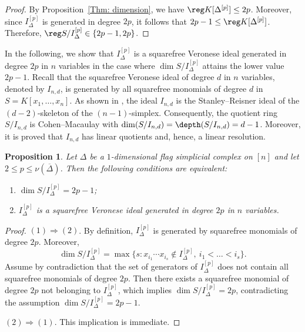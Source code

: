 \documentclass[12pt]{amsart}
\newtheorem{Proposition}[Theorem]{Proposition}
\begin{document}
\begin{proof}
By Proposition~\ref{Thm: dimension}, we have $\reg K[\Delta^{[p]}] \le 2p$. Moreover, since
$I_{\Delta}^{[p]}$ is generated in degree $2p$, it follows that
$2p-1 \le \reg K[\Delta^{[p]}]$. Therefore,
$\reg S/I_{\Delta}^{[p]} \in \{2p-1,2p\}$.
\end{proof}
In the following, we show that $I_{\Delta}^{[p]}$ is a squarefree Veronese ideal generated
in degree $2p$ in $n$ variables in the case where
$\dim S/I_{\Delta}^{[p]}$ attains the lower value $2p-1$. Recall that the squarefree
Veronese ideal of degree $d$ in $n$ variables, denoted by $I_{n,d}$, is generated by all squarefree monomials of degree $d$ in $S=K[x_1,\dots,x_n]$. As shown in
\cite{HHmonomialideals}, the ideal $I_{n,d}$ is the Stanley--Reisner ideal of the
$(d-2)$-skeleton of the $(n-1)$-simplex. Consequently, the quotient ring $S/I_{n,d}$ is Cohen--Macaulay with $\dim(S/I_{n,d})=\depth(S/I_{n,d})=d-1$. Moreover, it is proved that $I_{n,d}$ has linear quotients and, hence, a linear resolution.



\begin{Proposition}\label{prop: veronese}
Let $\Delta$ be a $1$-dimensional flag simplicial complex on $[n]$ and let
$2\leq p \leq \nu(\overline{\Delta})$. Then the following conditions are equivalent:
\begin{enumerate}
    \item $\dim S/I_{\Delta}^{[p]}=2p-1$;
    \item $I_{\Delta}^{[p]}$ is a squarefree Veronese ideal generated in degree $2p$
    in $n$ variables.
\end{enumerate}
\end{Proposition}

\begin{proof}
$(1)\Rightarrow(2)$. By definition, $I_{\Delta}^{[p]}$ is generated by squarefree monomials of degree $2p$. Moreover, 
\[
\dim S/I_{\Delta}^{[p]}
=\max\{s: x_{i_1}\cdots x_{i_s}\notin I_{\Delta}^{[p]},\ i_1<\dots<i_s\}.
\]
Assume by contradiction that the set of generators of $I_{\Delta}^{[p]}$ does not
contain all squarefree monomials of degree $2p$. Then there exists a squarefree
monomial of degree $2p$ not belonging to $I_{\Delta}^{[p]}$, which implies
$\dim S/I_{\Delta}^{[p]}=2p$, contradicting the assumption
$\dim S/I_{\Delta}^{[p]}=2p-1$.

\smallskip
$(2)\Rightarrow(1)$. This implication is immediate.
\end{proof}
\end{document}

